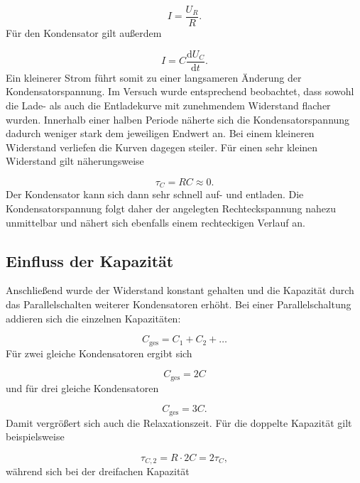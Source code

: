 \documentclass{report}
\begin{document}
\begin{equation}
I=\frac{U_R}{R}.
\end{equation}
\noindent
Für den Kondensator gilt außerdem

\begin{equation}
I=C\frac{\mathrm{d}U_C}{\mathrm{d}t}.
\end{equation}
\noindent
Ein kleinerer Strom führt somit zu einer langsameren Änderung der Kondensatorspannung. Im Versuch wurde entsprechend beobachtet, dass sowohl die Lade- als auch die Entladekurve mit zunehmendem Widerstand flacher wurden. Innerhalb einer halben Periode näherte sich die Kondensatorspannung dadurch weniger stark dem jeweiligen Endwert an.
\noindent
Bei einem kleineren Widerstand verliefen die Kurven dagegen steiler. Für einen sehr kleinen Widerstand gilt näherungsweise

\begin{equation}
\tau_C=RC\approx0.
\end{equation}
\noindent
Der Kondensator kann sich dann sehr schnell auf- und entladen. Die Kondensatorspannung folgt daher der angelegten Rechteckspannung nahezu unmittelbar und nähert sich ebenfalls einem rechteckigen Verlauf an.

\subsection{Einfluss der Kapazität}
\noindent
Anschließend wurde der Widerstand konstant gehalten und die Kapazität durch das Parallelschalten weiterer Kondensatoren erhöht. Bei einer Parallelschaltung addieren sich die einzelnen Kapazitäten:

\begin{equation}
C_{\mathrm{ges}}
=
C_1+C_2+\dots
\end{equation}
\noindent
Für zwei gleiche Kondensatoren ergibt sich

\begin{equation}
C_{\mathrm{ges}}=2C
\end{equation}
\noindent
und für drei gleiche Kondensatoren

\begin{equation}
C_{\mathrm{ges}}=3C.
\end{equation}
\noindent
Damit vergrößert sich auch die Relaxationszeit. Für die doppelte Kapazität gilt beispielsweise

\begin{equation}
\tau_{C,2}
=
R\cdot2C
=
2\tau_C,
\end{equation}
\noindent
während sich bei der dreifachen Kapazität
\end{document}
